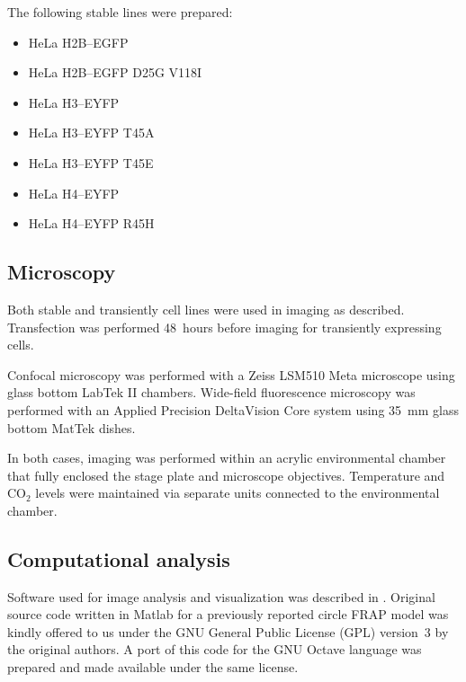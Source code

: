     The following stable lines were prepared:

    \begin{itemize}
      \item HeLa H2B--EGFP
      \item HeLa H2B--EGFP D25G V118I
      \item HeLa H3--EYFP
      \item HeLa H3--EYFP T45A
      \item HeLa H3--EYFP T45E
      \item HeLa H4--EYFP
      \item HeLa H4--EYFP R45H
    \end{itemize}

  \subsection{Microscopy}

    Both stable and transiently cell lines were used in imaging as described.
    Transfection was performed 48~hours before imaging for transiently
    expressing cells.

    Confocal microscopy was performed with a Zeiss LSM510 Meta microscope
    using glass bottom LabTek II chambers. Wide-field fluorescence microscopy
    was performed with an Applied Precision DeltaVision Core system
    using \SI{35}{\mm} glass bottom MatTek dishes.

    In both cases, imaging was performed within an acrylic environmental
    chamber that fully enclosed the stage plate and microscope objectives.
    Temperature and CO$_2$ levels were maintained via separate units connected
    to the environmental chamber.

  \subsection{Computational analysis}

    Software used for image analysis and visualization was described in
    .
    Original source code written in Matlab for a previously
    reported circle FRAP model \citep{mcnally-frap-code} was kindly offered
    to us under the GNU General Public License (GPL) version~3 by the
    original authors. A port of this code for the GNU Octave language was
    prepared and made available under the same license.
